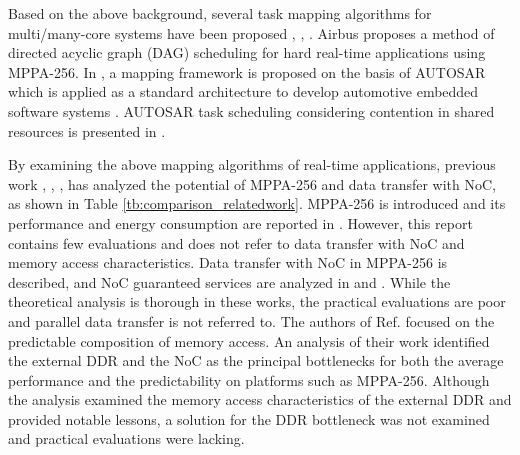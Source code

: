   Based on the above background, several task mapping algorithms for multi/many-core systems have been proposed \cite{carle2014static}, \cite{faragardi2014communication}, \cite{perret2016mapping}.
  Airbus \cite{perret2016mapping} proposes a method of directed acyclic graph (DAG) scheduling for hard real-time applications using MPPA-256.
  In \cite{faragardi2014communication}, a mapping framework is proposed on the basis of AUTOSAR which is applied as a standard architecture to develop automotive embedded software systems \cite{furst2009autosar}.
  AUTOSAR task scheduling considering contention in shared resources is presented in \cite{becker2016contention}.
  
  By examining the above mapping algorithms of real-time applications, previous work \cite{deDinechin2014GSN}, \cite{denet2017work}, \cite{kanter2015kalray}, \cite{perret2016predictable} has analyzed the potential of MPPA-256 and data transfer with NoC, as shown in Table \ref{tb:comparison_relatedwork}.
  MPPA-256 is introduced and its performance and energy consumption are reported in \cite{kanter2015kalray}.
  However, this report contains few evaluations and does not refer to data transfer with NoC and memory access characteristics.
  Data transfer with NoC in MPPA-256 is described, and NoC guaranteed services are analyzed in \cite{deDinechin2014GSN} and \cite{denet2017work}.
  While the theoretical analysis is thorough in these works, the practical evaluations are poor and parallel data transfer is not referred to.
  The authors of Ref. \cite{perret2016predictable} focused on the predictable composition of memory access.
  An analysis of their work identified the external DDR and the NoC as the principal bottlenecks for both the average performance and the predictability on platforms such as MPPA-256.
  Although the analysis examined the memory access characteristics of the external DDR and provided notable lessons, a solution for the DDR bottleneck was not examined and practical evaluations were lacking.
  
